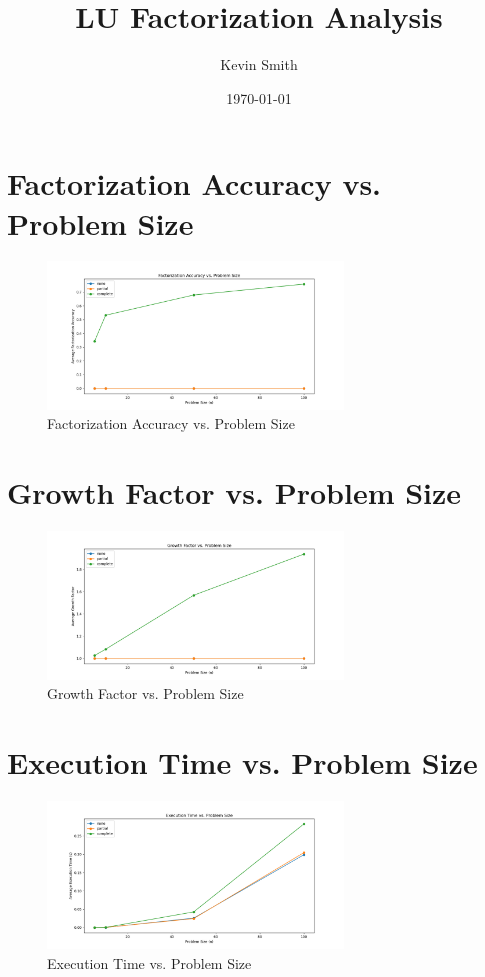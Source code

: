 \documentclass{article}
\title{LU Factorization Analysis}
\author{Kevin Smith}
\date{\today}
\begin{document}
\maketitle
\section{Factorization Accuracy vs. Problem Size}
\begin{figure}[H]
    \centering
    \includegraphics[width=0.7\textwidth]{acc_over_n.png}
    \caption{Factorization Accuracy vs. Problem Size}
    \label{fig:acc_over_n}
\end{figure}

\section{Growth Factor vs. Problem Size}
\begin{figure}[H]
    \centering
    \includegraphics[width=0.7\textwidth]{grow_fac.png}
    \caption{Growth Factor vs. Problem Size}
    \label{fig:grow_fac}
\end{figure}

\section{Execution Time vs. Problem Size}
\begin{figure}[H]
    \centering
    \includegraphics[width=0.7\textwidth]{ex_time.png}
    \caption{Execution Time vs. Problem Size}
    \label{fig:ex_time}
\end{figure}
\end{document}
